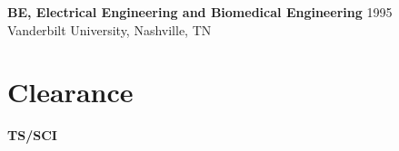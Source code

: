 \begin{resume}
{\bf BE, Electrical Engineering and Biomedical Engineering} \hfill 1995\\
Vanderbilt University, Nashville, TN

%

\section{Clearance} 
{\bf TS/SCI}

\end{resume} 
 



